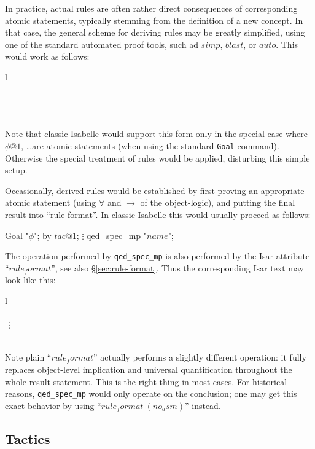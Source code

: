 \medskip In practice, actual rules are often rather direct consequences of
corresponding atomic statements, typically stemming from the definition of a
new concept.  In that case, the general scheme for deriving rules may be
greatly simplified, using one of the standard automated proof tools, such ad
$simp$, $blast$, or $auto$.  This would work as follows:
\begin{matharray}{l}
   \\
  \quad {} \quad {} \\
  \quad {} \\
  \quad \DONE \\
\end{matharray}
Note that classic Isabelle would support this form only in the special case
where $\phi@1$, \dots are atomic statements (when using the standard
\texttt{Goal} command).  Otherwise the special treatment of rules would be
applied, disturbing this simple setup.

\medskip Occasionally, derived rules would be established by first proving an
appropriate atomic statement (using $\forall$ and $\longrightarrow$ of the
object-logic), and putting the final result into ``rule format''.  In classic
Isabelle this would usually proceed as follows:
\begin{ttbox}
 Goal "\(\phi\)";
 by \(tac@1\);
   \(\vdots\)
 qed_spec_mp "\(name\)";
\end{ttbox}
The operation performed by \texttt{qed_spec_mp} is also performed by the Isar
attribute ``$rule_format$'', see also \S\ref{sec:rule-format}.  Thus the
corresponding Isar text may look like this:
\begin{matharray}{l}
   \\
  \quad {} \\
  \qquad \vdots \\
  \quad \DONE \\
\end{matharray}
Note plain ``$rule_format$'' actually performs a slightly different operation:
it fully replaces object-level implication and universal quantification
throughout the whole result statement.  This is the right thing in most cases.
For historical reasons, \texttt{qed_spec_mp} would only operate on the
conclusion; one may get this exact behavior by using
``$rule_format~(no_asm)$'' instead.

\subsection{Tactics}\label{sec:conv-tac}

